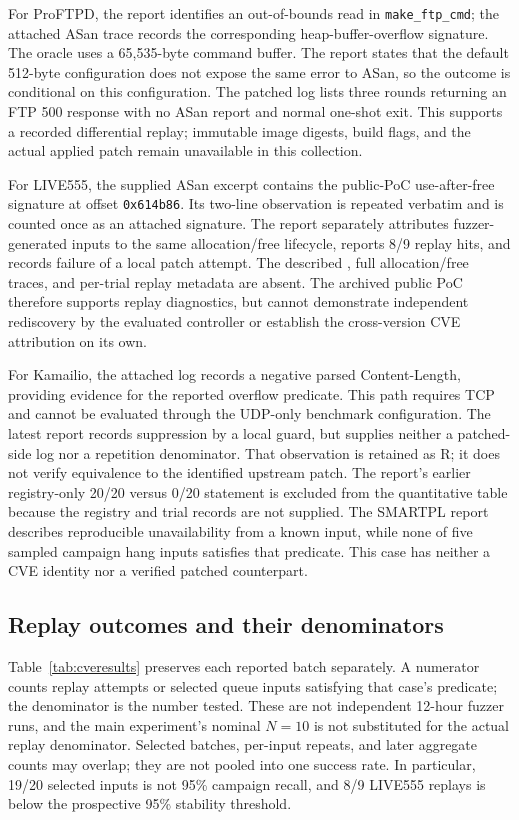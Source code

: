 \documentclass[final,5p,times,number]{elsarticle}
\begin{document}
For ProFTPD, the report identifies an out-of-bounds read in \texttt{make\_ftp\_cmd}; the attached ASan trace records the corresponding heap-buffer-overflow signature. The oracle uses a 65,535-byte command buffer. The report states that the default 512-byte configuration does not expose the same error to ASan, so the outcome is conditional on this configuration. The patched log lists three rounds returning an FTP 500 response with no ASan report and normal one-shot exit. This supports a recorded differential replay; immutable image digests, build flags, and the actual applied patch remain unavailable in this collection.

For LIVE555, the supplied ASan excerpt contains the public-PoC use-after-free signature at offset \texttt{0x614b86}. Its two-line observation is repeated verbatim and is counted once as an attached signature. The report separately attributes fuzzer-generated inputs to the same allocation/free lifecycle, reports 8/9 replay hits, and records failure of a local patch attempt. The described , full allocation/free traces, and per-trial replay metadata are absent. The archived public PoC therefore supports replay diagnostics, but cannot demonstrate independent rediscovery by the evaluated controller or establish the cross-version CVE attribution on its own.

For Kamailio, the attached log records a negative parsed Content-Length, providing evidence for the reported overflow predicate. This path requires TCP and cannot be evaluated through the UDP-only benchmark configuration. The latest report records suppression by a local guard, but supplies neither a patched-side log nor a repetition denominator. That observation is retained as R; it does not verify equivalence to the identified upstream patch. The report's earlier registry-only 20/20 versus 0/20 statement is excluded from the quantitative table because the registry and trial records are not supplied. The SMARTPL report describes reproducible unavailability from a known input, while none of five sampled campaign hang inputs satisfies that predicate. This case has neither a CVE identity nor a verified patched counterpart.

\subsection{Replay outcomes and their denominators}
Table~\ref{tab:cveresults} preserves each reported batch separately. A numerator counts replay attempts or selected queue inputs satisfying that case's predicate; the denominator is the number tested. These are not independent 12-hour fuzzer runs, and the main experiment's nominal $N=10$ is not substituted for the actual replay denominator. Selected batches, per-input repeats, and later aggregate counts may overlap; they are not pooled into one success rate. In particular, 19/20 selected inputs is not 95\% campaign recall, and 8/9 LIVE555 replays is below the prospective 95\% stability threshold.
\end{document}
